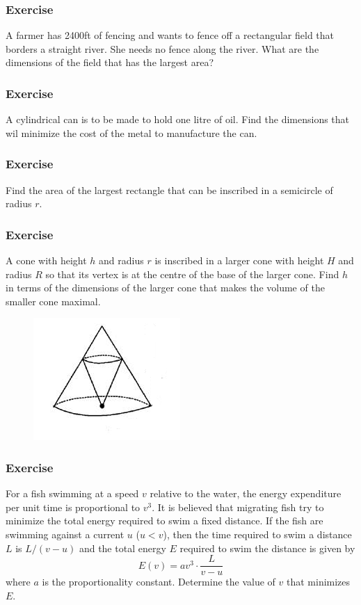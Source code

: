\documentclass[xcolor=dvipsnames]{beamer}
\begin{document}
\begin{frame}
  \frametitle{Exercise}
  {\ubung} A farmer has 2400ft of fencing and wants to fence off a
  rectangular field that borders a straight river. She needs no fence
  along the river. What are the dimensions of the field that has the
  largest area?
\end{frame}

\begin{frame}
  \frametitle{Exercise}
  {\ubung} A cylindrical can is to be made to hold one litre of oil.
  Find the dimensions that wil minimize the cost of the metal to
  manufacture the can.
\end{frame}

\begin{frame}
  \frametitle{Exercise}
  {\ubung} Find the area of the largest rectangle that can be
  inscribed in a semicircle of radius $r$.
\end{frame}

\begin{frame}
  \frametitle{Exercise}
  {\ubung} A cone with height $h$ and radius $r$ is inscribed in a
  larger cone with height $H$ and radius $R$ so that its vertex is at
  the centre of the base of the larger cone. Find $h$ in terms of the
  dimensions of the larger cone that makes the volume of the smaller
  cone maximal.
\begin{figure}[h]
\includegraphics[scale=.75]{./diagrams/coneopt.png}
\end{figure}
\end{frame}

\begin{frame}
  \frametitle{Exercise}
  {\ubung} For a fish swimming at a speed $v$ relative to the water,
  the energy expenditure per unit time is proportional to $v^{3}$. It
  is believed that migrating fish try to minimize the total energy
  required to swim a fixed distance. If the fish are swimming against
  a current $u$ ($u<v$), then the time required to swim a distance $L$
  is $L/(v-u)$ and the total energy $E$ required to swim the distance
  is given by
  \begin{equation}
    \label{eq:aiyeiyoo}
    E(v)=av^{3}\cdot\frac{L}{v-u}
  \end{equation}
  where $a$ is the proportionality constant. Determine the value of
  $v$ that minimizes $E$.
\end{frame}
\end{document}
